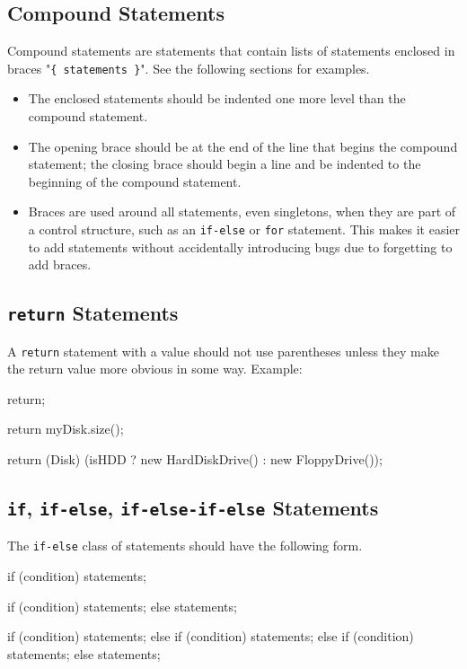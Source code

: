 \documentclass{article}
\begin{document}
\subsection{Compound Statements}
\label{compoundstatements}

Compound statements are statements that contain lists of statements enclosed in braces
"\texttt{\{ statements \}}". See the following sections for examples.

\begin{itemize}
\item The enclosed statements should be indented one more level than the compound statement.
\item The opening brace should be at the end of the line that begins the compound statement; the
  closing brace should begin a line and be indented to the beginning of the compound statement.
\item Braces are used around all statements, even singletons, when they are part of a control
  structure, such as an \texttt{if-else} or \texttt{for} statement. This makes it easier to add
  statements without accidentally introducing bugs due to forgetting to add braces.
\end{itemize}

\subsection{\texttt{return} Statements}

A \texttt{return} statement with a value should not use parentheses unless they make the return
value more obvious in some way. Example:

\begin{snippet}
return;

return myDisk.size();

return (Disk) (isHDD ? new HardDiskDrive() : new FloppyDrive());
\end{snippet}

\subsection{\texttt{if}, \texttt{if-else}, \texttt{if-else-if-else} Statements}

The \texttt{if-else} class of statements should have the following form.

\begin{snippet}
if (condition) {
    statements;
}

if (condition) {
    statements;
} else {
    statements;
}

if (condition) {
    statements;
} else if (condition) {
    statements;
} else if (condition) {
    statements;
} else {
    statements;
}
\end{snippet}
\end{document}
